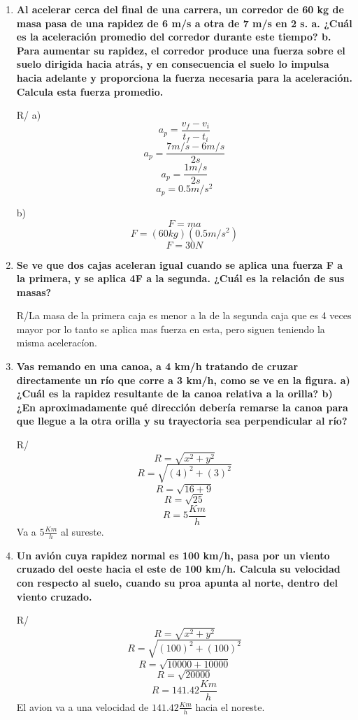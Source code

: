 \documentclass[a4paper]{article}
\begin{document}
\begin{enumerate}
		\item\textbf{ Al acelerar cerca del final de una carrera, un corredor de 60 kg de masa pasa de una rapidez de 6 
			m/s a otra de 7 m/s en 2 s. 
			a. ¿Cuál es la aceleración promedio del corredor durante este tiempo? 
			b. Para aumentar su rapidez, el corredor produce una fuerza sobre el suelo dirigida hacia 
			atrás, y en consecuencia el suelo lo impulsa hacia adelante y proporciona la fuerza 
			necesaria para la aceleración. Calcula esta fuerza promedio.}
		
		R/ a) $$a_{p}=\frac{v_{f}-v_{i}}{t_{f}-t_{i}}$$
		$$a_{p}=\frac{7m/s-6m/s}{2s}$$
		$$a_{p}=\frac{1m/s}{2s}$$
		$$a_{p}=0.5m/s^2$$
		
		b) $$F=ma$$
		$$F=(60kg)(0.5m/s^2)$$
		$$F=30N$$
		
		\item\textbf{Se ve que dos cajas aceleran igual cuando se aplica una fuerza F a la primera, y se aplica 4F a la 
			segunda. ¿Cuál es la relación de sus masas?} 
		
		R/La masa de la primera caja es menor a la de la segunda caja que es 4 veces mayor por lo tanto se aplica mas fuerza en esta, pero siguen teniendo la misma aceleracíon.
		
		\item\textbf{Vas remando en una canoa, a 4 km/h tratando de cruzar directamente un río que corre a 3 km/h, 
			como se ve en la figura. a) ¿Cuál es la rapidez resultante de la canoa relativa a la orilla? b) ¿En 
			aproximadamente qué dirección debería remarse la canoa para que llegue a la otra orilla y su 
			trayectoria sea perpendicular al río?} 
		
		\begin{figure}[!ht]  
			
			
		\end{figure}
		
		R/ $$R=\sqrt{x^2+y^2}$$
		$$R=\sqrt{(4)^2+(3)^2}$$
		$$R=\sqrt{16+9}$$
		$$R=\sqrt{25}$$
		$$R=5\frac{Km}{h}$$
		Va a $5\frac{Km}{h}$ al sureste.
		
		\newpage
		
		\item\textbf{Un avión cuya rapidez normal es 100 km/h, pasa por un viento cruzado del oeste hacia el este de 
			100 km/h. Calcula su velocidad con respecto al suelo, cuando su proa apunta al norte, dentro del 
			viento cruzado.}
		
		R/ $$R=\sqrt{x^2+y^2}$$
		$$R=\sqrt{(100)^2+(100)^2}$$
		$$R=\sqrt{10000+10000}$$
		$$R=\sqrt{20000}$$
		$$R=141.42\frac{Km}{h}$$
		El avion va a una velocidad de $141.42\frac{Km}{h}$ hacia el noreste.
		

\end{enumerate}
\end{document}
